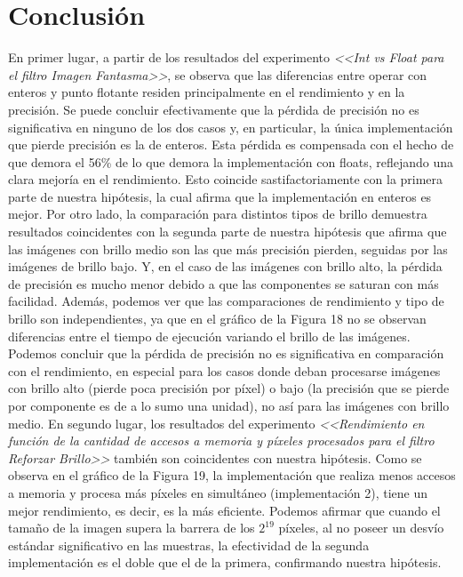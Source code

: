\documentclass[a4paper]{article}
\begin{document}
\section{Conclusión}
\justify
En primer lugar, a partir de los resultados del experimento \textit{<<Int vs Float para el filtro Imagen Fantasma>>}, se observa que las diferencias  entre operar con enteros y punto flotante residen principalmente en el rendimiento y en la precisión. Se puede concluir efectivamente que la pérdida de precisión no es significativa en ninguno de los dos casos y, en particular, la única implementación que pierde precisión es la de enteros. Esta pérdida es compensada con el hecho de que demora el 56\% de lo que demora la implementación con floats, reflejando una clara mejoría en el rendimiento. Esto coincide sastifactoriamente con la primera parte de nuestra hipótesis, la cual afirma que la implementación en enteros es mejor.
\justify
Por otro lado, la comparación para distintos tipos de brillo demuestra resultados coincidentes con la segunda parte de nuestra hipótesis que afirma que las imágenes con brillo medio son las que más precisión pierden, seguidas por las imágenes de brillo bajo. Y, en el caso de las imágenes con brillo alto, la pérdida de precisión es mucho menor debido a que las componentes se saturan con más facilidad. Además, podemos ver que las comparaciones de rendimiento y tipo de brillo son independientes, ya que en el gráfico de la Figura 18 no se observan diferencias entre el tiempo de ejecución variando el brillo de las imágenes. Podemos concluir que la pérdida de precisión no es significativa en comparación con el rendimiento, en especial para los casos donde deban procesarse imágenes con brillo alto (pierde poca precisión por píxel) o bajo (la precisión que se pierde por componente es de a lo sumo una unidad), no así para las imágenes con brillo medio. 
\justify
En segundo lugar, los resultados del experimento \textit{<<Rendimiento en función de la cantidad de accesos a memoria y píxeles procesados para el filtro Reforzar Brillo>>} también son coincidentes con nuestra hipótesis. Como se observa en el gráfico de la Figura 19, la implementación que realiza menos accesos a memoria y procesa más píxeles en simultáneo (implementación 2), tiene un mejor rendimiento, es decir, es la más eficiente. Podemos afirmar que cuando el tamaño de la imagen supera la barrera de los $2^{19}$ píxeles, al no poseer un desvío estándar significativo en las muestras, la efectividad de la segunda implementación es el doble que el de la primera, confirmando nuestra hipótesis. 
\end{document}
